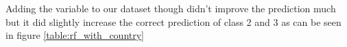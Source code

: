 
Adding the variable to our dataset though didn't improve the prediction much but it did slightly increase the correct prediction of class 2 and 3 as can be seen in figure \ref{table:rf_with_country}

